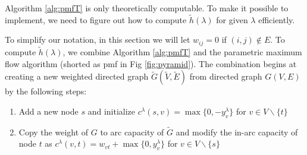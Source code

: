 \documentclass{article}
\begin{document}
Algorithm \ref{alg:pmfT} is only theoretically computable. To make it possible to implement, we need to figure out how to compute $\tilde{h}(\lambda)$ for given $\lambda$ efficiently.

To simplify our notation, in this section we will let $w_{ij} = 0$ if $(i,j) \not\in E$. To compute $\tilde{h}(\lambda)$, we combine Algorithm \ref{alg:pmfT} and the parametric maximum flow algorithm (shorted as \textsf{pmf} in Fig \ref{fig:pyramid}). The combination begins at creating a new weighted directed graph $\widetilde{G}(\widetilde{V}, \widetilde{E})$ from directed graph $G(V,E)$ by the following steps:
\begin{enumerate}
	\item Add a new node $s$ and initialize $c^{\lambda}(s,v)=\max\{0, -y^{\lambda}_v\}$ for $v \in V\backslash \{t\}$
	\item Copy the weight of $G$ to arc capacity of $\widetilde{G}$ and modify the in-arc capacity of node $t$ as $c^{\lambda}(v,t) = w_{vt} + \max\{0, y^{\lambda}_v\}$ for $ v \in V\backslash \{s\}$
	\end{enumerate}
\end{document}
